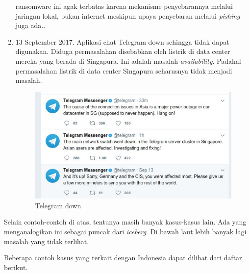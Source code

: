 \begin{enumerate}
      ransomware ini agak terbatas karena mekanisme penyebarannya melalui
      jaringan lokal, bukan internet meskipun upaya penyebaran melalui 
      {\em pishing} juga ada..
   \item 13 September 2017. Aplikasi chat Telegram down sehingga tidak dapat
      digunakan. Diduga permasalahan disebabkan oleh listrik di data center
      mereka yang berada di Singapura. Ini adalah masalah {\em availability}.
      Padahal permasalahan listrik di data center Singapura seharusnya tidak
      menjadi masalah.
      \begin{figure}[ht]
      \includegraphics[width=1.0\linewidth]{graphics/telegram-down.jpg}
      \caption{Telegram down}                                                   
      \label{fig:telegram-down}                                                 
      \end{figure}
\end{enumerate}

Selain contoh-contoh di atas, tentunya masih banyak kasus-kasus lain.
Ada yang menganalogikan ini sebagai puncak dari {\em iceberg}.
Di bawah laut lebih banyak lagi masalah yang tidak terlihat.

Beberapa contoh kasus yang terkait dengan Indonesia dapat
dilihat dari daftar berikut.


